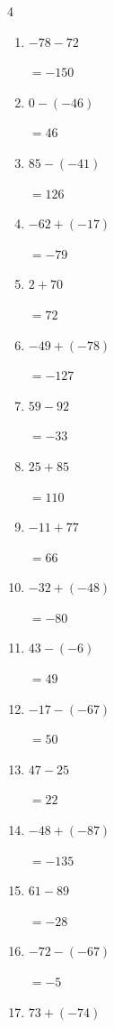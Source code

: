 \begin{multicols}{4}
\begin{enumerate}
        $=46$

  \item $-78-72$

        $=-150$

  \item $0-(-46)$

        $=46$

  \item $85-(-41)$

        $=126$

  \item $-62+(-17)$

        $=-79$

  \item $2+70$

        $=72$

  \item $-49+(-78)$

        $=-127$

  \item $59-92$

        $=-33$

\columnbreak %

  \item $25+85$

        $=110$

  \item $-11+77$

        $=66$

  \item $-32+(-48)$

        $=-80$

  \item $43-(-6)$

        $=49$

  \item $-17-(-67)$

        $=50$

  \item $47-25$

        $=22$

  \item $-48+(-87)$

        $=-135$

  \item $61-89$

        $=-28$

  \item $-72-(-67)$

        $=-5$

  \item $73+(-74)$


\end{enumerate}
\end{multicols}
